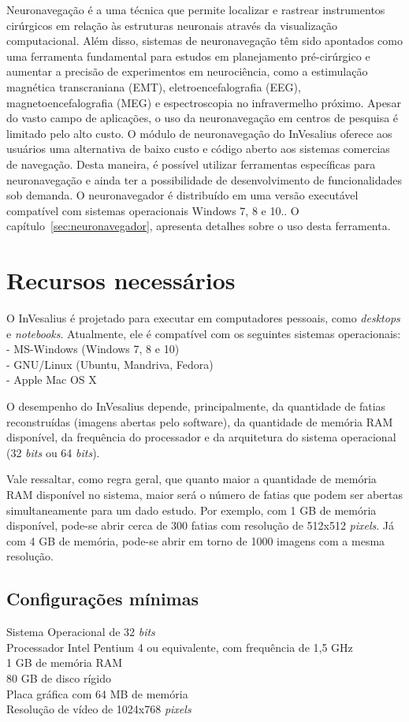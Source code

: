 Neuronavegação é a uma técnica que permite localizar e rastrear instrumentos cirúrgicos em relação às estruturas neuronais através da visualização computacional. Além disso, sistemas de neuronavegação têm sido apontados como uma ferramenta fundamental para estudos em planejamento pré-cirúrgico e aumentar a precisão de experimentos em neurociência, como a estimulação magnética transcraniana (EMT), eletroencefalografia (EEG), magnetoencefalografia (MEG) e espectroscopia no infravermelho próximo. Apesar do vasto campo de aplicações, o uso da neuronavegação em centros de pesquisa é limitado pelo alto custo. O módulo de neuronavegação do InVesalius oferece aos usuários uma alternativa de baixo custo e código aberto aos sistemas comercias de navegação. Desta maneira, é possível utilizar ferramentas específicas para neuronavegação e ainda ter a possibilidade de desenvolvimento de funcionalidades sob demanda. O neuronavegador é distribuído em uma versão executável compatível com sistemas operacionais Windows 7, 8 e 10.. O capítulo~\ref{sec:neuronavegador}, apresenta detalhes sobre o uso desta ferramenta.


\section{Recursos necessários}
O InVesalius é projetado para executar em computadores pessoais, como
\textit{desktops} e \textit{notebooks}. Atualmente, ele é compatível com
os seguintes sistemas operacionais:\\
- MS-Windows (Windows 7, 8 e 10)\\
- GNU/Linux (Ubuntu, Mandriva, Fedora)\\
- Apple Mac OS X

O desempenho do InVesalius depende, principalmente, da quantidade de fatias
reconstruídas (imagens abertas pelo software), da quantidade de memória RAM
disponível, da frequência do processador e da arquitetura do sistema operacional
(32 \textit{bits} ou 64 \textit{bits}).

Vale ressaltar, como regra geral, que quanto maior a quantidade de memória RAM
disponível no sistema, maior será o número de fatias que podem ser abertas
simultaneamente para um dado estudo. Por exemplo, com 1 GB de memória disponível,
pode-se abrir cerca de 300 fatias com resolução de 512x512 \textit{pixels}.
Já com 4 GB de memória, pode-se abrir em torno de 1000 imagens com a mesma
resolução.

			
\subsection{Configurações mínimas}
Sistema Operacional de 32 \textit{bits}\\
Processador Intel Pentium 4 ou equivalente, com frequência de 1,5 GHz\\
1 GB de memória RAM\\
80 GB de disco rígido\\
Placa gráfica com 64 MB de memória\\
Resolução de vídeo de 1024x768 \textit{pixels}


